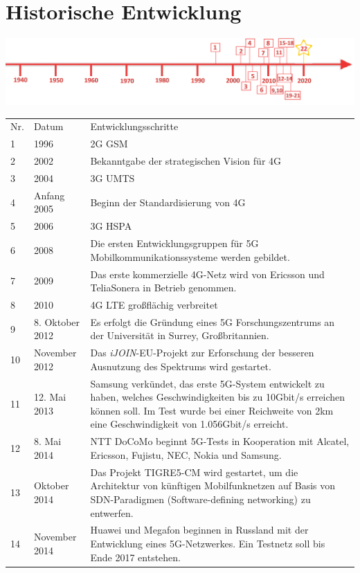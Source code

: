 \section*{Historische Entwicklung}
\includegraphics[width=\textwidth]{Kapitel/5G/Grafiken/Zeitstrahl2}
\par
\noindent
{}
\begin{tabular}{p{1 cm}p{3 cm}p{13.55 cm}}
	Nr. & Datum & Entwicklungsschritte~\cite{5g.1}\\
	1 & 1996 & 2G GSM \\
	2 & 2002 & Bekanntgabe der strategischen Vision für 4G\cite{5g.5} \\
	3 & 2004 & 3G UMTS\\
	4 & Anfang 2005 & Beginn der Standardisierung von 4G\cite{5g.5} \\
	5 & 2006 & 3G HSPA\\
	6 & 2008 & Die ersten Entwicklungsgruppen für 5G Mobilkommunikationssysteme werden gebildet.\\
	7 & 2009 & Das erste kommerzielle 4G-Netz wird von Ericsson und TeliaSonera in Betrieb genommen. \\
	8 & 2010 & 4G LTE großflächig verbreitet \\
	9 & 8. Oktober 2012 & Es erfolgt die Gründung eines 5G Forschungszentrums an der Universität in Surrey, Großbritannien. \\
	10 & November 2012 & Das \textit{iJOIN}-EU-Projekt zur Erforschung der besseren Ausnutzung des Spektrums wird gestartet. \\
	11 & 12. Mai 2013 & Samsung verkündet, das erste 5G-System entwickelt zu haben, welches Geschwindigkeiten bis zu 10Gbit/s erreichen können soll. Im Test wurde bei einer Reichweite von 2km eine Geschwindigkeit von 1.056Gbit/s erreicht. \\
	12 & 8. Mai 2014 & NTT DoCoMo beginnt 5G-Tests in Kooperation mit Alcatel, Ericsson, Fujistu, NEC, Nokia und Samsung. \\
	13 & Oktober 2014 & Das Projekt TIGRE5-CM wird gestartet, um die Architektur von künftigen Mobilfunknetzen auf Basis von SDN-Paradigmen (Software-defining networking) zu entwerfen. \\
	14 & November 2014 & Huawei und Megafon beginnen in Russland mit der Entwicklung eines 5G-Netzwerkes. Ein Testnetz soll bis Ende 2017 entstehen. \\

\end{tabular}
